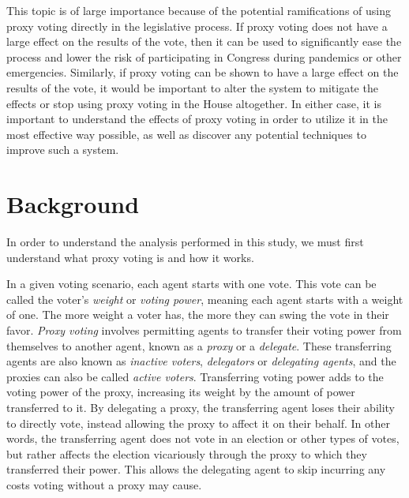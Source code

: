 This topic is of large importance because of the potential ramifications of using
proxy voting directly in the legislative process.
If proxy voting does not have a large effect on the results of the vote, then it
can be used to significantly ease the process and lower the risk of participating in
Congress during pandemics or other emergencies.
Similarly, if proxy voting can be shown to have a large effect on the results of the
vote, it would be important to alter the system to mitigate the effects or stop using
proxy voting in the House altogether.
In either case, it is important to understand the effects of proxy voting in order to
utilize it in the most effective way possible, as well as discover any potential
techniques to improve such a system.


\section{Background}\label{sec:background}
In order to understand the analysis performed in this study, we must first understand
what proxy voting is and how it works.

In a given voting scenario, each agent starts with one vote.
This vote can be called the voter's \textit{weight} or \textit{voting power}, meaning
each agent starts with a weight of one.
The more weight a voter has, the more they can swing the vote in their favor.
\textit{Proxy voting} involves permitting agents to transfer their voting power
from themselves to another agent, known as a \textit{proxy} or a \textit{delegate}.
These transferring agents are also known as \textit{inactive voters},
\textit{delegators} or \textit{delegating agents}, and the proxies can also be called
\textit{active voters}.
Transferring voting power adds to the voting power of the proxy, increasing its
weight by the amount of power transferred to it.
By delegating a proxy, the transferring agent loses their ability to directly vote,
instead allowing the proxy to affect it on their behalf.
In other words, the transferring agent does not vote in an election or other types of
votes, but rather affects the election vicariously through the proxy to which they
transferred their power.
This allows the delegating agent to skip incurring any costs voting without a proxy
may cause.

